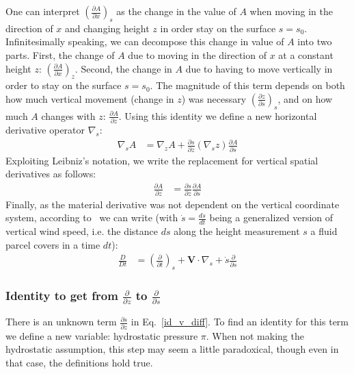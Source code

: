 One can interpret $\left(\frac{\partial A}{\partial x}\right)_s$ as the change in the value of $A$ when moving in the direction of $x$ and changing height $z$ in order stay on the surface $s=s_0$.
Infinitesimally speaking, we can decompose this change in value of $A$ into two parts.
First, the change of $A$ due to moving in the direction of $x$ at a constant height $z$: $\left( \frac{\partial A}{\partial x}\right)_z$.
Second, the change in $A$ due to having to move vertically in order to stay on the surface $s=s_0$.
The magnitude of this term depends on both how much vertical movement (change in $z$) was necessary $\left(\frac{\partial z}{\partial s}\right)_s$, and on how much $A$ changes with $z$: $\frac{\partial A}{\partial z}$. 
Using this identity we define a new horizontal derivative operator $\nabla_s$:
\begin{align}
\nabla _s A &= \nabla _z A+\frac{\partial s}{\partial z}(\nabla _sz)\frac{\partial A}{\partial s}\label{id_h_diff}
\end{align}
Exploiting Leibniz's notation, we write the replacement for vertical spatial derivatives as follows:
\begin{align}
\frac{\partial A}{\partial z} &= \frac{\partial s}{\partial z} \frac{\partial A}{\partial s}\label{id_v_diff}
\end{align}
Finally, as the material derivative was not dependent on the vertical coordinate system, according to~\cite{kasahara1974various} we can write (with $\dot{s}=\frac{ds}{dt}$ being a generalized version of vertical wind speed, i.e. the distance $ds$ along the height measurement $s$ a fluid parcel covers in a time $dt$):
\begin{align}
\frac{D}{Dt} &= \left(\frac{\partial}{\partial t}\right)_s + \textbf{V} \cdot \nabla _s + \dot{s}\frac{\partial }{\partial s}\label{id_t_diff}
\end{align}

\subsubsection{Identity to get from $\frac{\partial}{\partial z}$ to $\frac{\partial}{\partial s}$}
There is an unknown term $\frac{\partial s}{\partial z}$ in Eq.~\ref{id_v_diff}.
To find an identity for this term we define a new variable: hydrostatic pressure $\pi$.
When not making the hydrostatic assumption, this step may seem a little paradoxical, though even in that case, the definitions hold true.
\\

